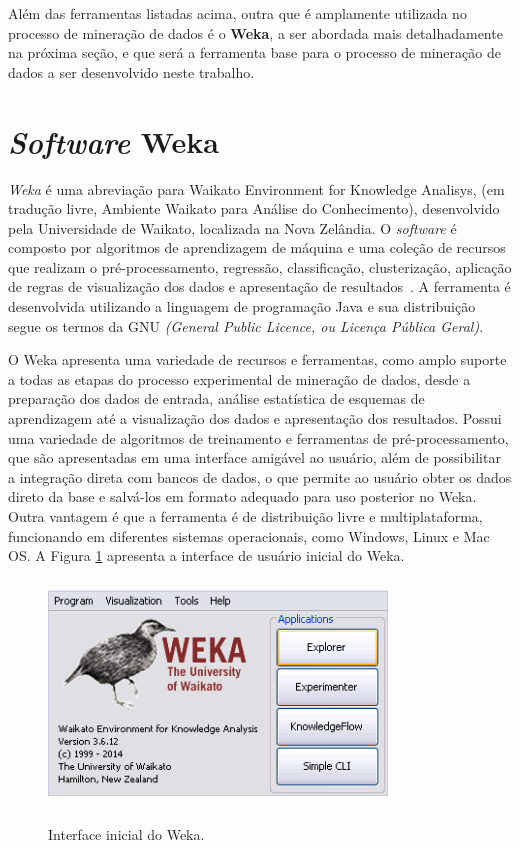 Além das ferramentas listadas acima, outra que é amplamente utilizada no processo de mineração de dados é o \textbf{Weka}, a ser abordada mais detalhadamente na próxima seção, e que será a ferramenta base para o processo de mineração de dados a ser desenvolvido neste trabalho.

\section{\textit{Software} Weka} \label{3title5}

\textit{Weka} é uma abreviação para Waikato Environment for Knowledge Analisys, (em tradução livre, Ambiente Waikato para Análise do Conhecimento), desenvolvido pela Universidade de Waikato, localizada na Nova Zelândia. O \textit{software} é composto por algoritmos de aprendizagem de máquina e uma coleção de recursos que realizam o pré-processamento, regressão, classificação, clusterização, aplicação de regras de visualização dos dados e apresentação de resultados~\citep{weka}. A ferramenta é desenvolvida utilizando a linguagem de programação Java e sua distribuição segue os termos da GNU \textit{(General Public Licence, ou Licença Pública Geral)}. 

O Weka apresenta uma variedade de recursos e ferramentas, como amplo suporte a todas as etapas do processo experimental de mineração de dados, desde a preparação dos dados de entrada, análise estatística de esquemas de aprendizagem até a visualização dos dados e apresentação dos resultados. Possui uma variedade de algoritmos de treinamento e ferramentas de pré-processamento, que são apresentadas em uma interface amigável ao usuário, além de possibilitar a integração direta com bancos de dados, o que permite ao usuário obter os dados direto da base e salvá-los em formato adequado para uso posterior no Weka. Outra vantagem é que a ferramenta é de distribuição livre e multiplataforma, funcionando em diferentes sistemas operacionais, como Windows, Linux e Mac OS. A Figura \ref{weka} apresenta a interface de usuário inicial do Weka.

\begin{figure}[!htb]
	\centering
	{\includegraphics[width=9cm,height=6cm]{images/weka}}
	\caption {Interface inicial do Weka.}
	\label{weka}
\end{figure}



